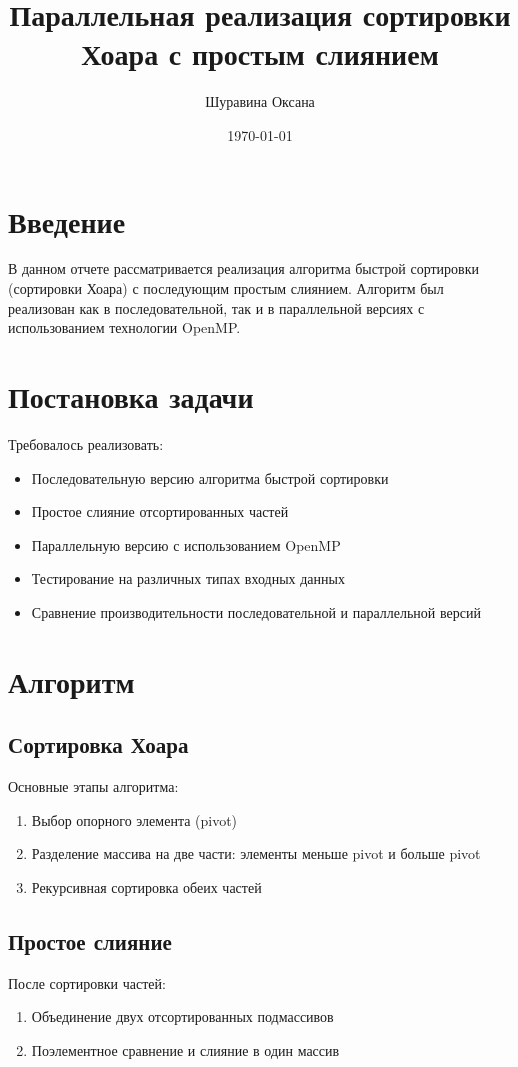 \documentclass[a4paper,12pt]{article}
\title{Параллельная реализация сортировки Хоара с простым слиянием}
\author{Шуравина Оксана}
\date{\today}
\begin{document}
\maketitle

\section{Введение}
В данном отчете рассматривается реализация алгоритма быстрой сортировки (сортировки Хоара) с последующим простым слиянием. Алгоритм был реализован как в последовательной, так и в параллельной версиях с использованием технологии OpenMP.

\section{Постановка задачи}
Требовалось реализовать:
\begin{itemize}
    \item Последовательную версию алгоритма быстрой сортировки
    \item Простое слияние отсортированных частей
    \item Параллельную версию с использованием OpenMP
    \item Тестирование на различных типах входных данных
    \item Сравнение производительности последовательной и параллельной версий
\end{itemize}

\section{Алгоритм}
\subsection{Сортировка Хоара}
Основные этапы алгоритма:
\begin{enumerate}
    \item Выбор опорного элемента (pivot)
    \item Разделение массива на две части: элементы меньше pivot и больше pivot
    \item Рекурсивная сортировка обеих частей
\end{enumerate}

\subsection{Простое слияние}
После сортировки частей:
\begin{enumerate}
    \item Объединение двух отсортированных подмассивов
    \item Поэлементное сравнение и слияние в один массив
\end{enumerate}
\end{document}
